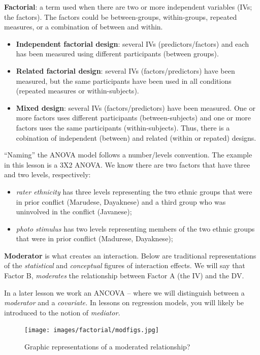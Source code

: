 \documentclass[
  11pt,
]{book}
\providecommand{\tightlist}{%
  \setlength{\itemsep}{0pt}\setlength{\parskip}{0pt}}
\begin{document}
\textbf{Factorial}: a term used when there are two or more independent variables (IVs; the factors). The factors could be between-groups, within-groups, repeated measures, or a combination of between and within.

\begin{itemize}
\tightlist
\item
  \textbf{Independent factorial design}: several IVs (predictors/factors) and each has been measured using different participants (between groups).
\item
  \textbf{Related factorial design}: several IVs (factors/predictors) have been measured, but the same participants have been used in all conditions (repeated measures or within-subjects).
\item
  \textbf{Mixed design}: several IVs (factors/predictors) have been measured. One or more factors uses different participants (between-subjects) and one or more factors uses the same participants (within-subjects). Thus, there is a cobination of independent (between) and related (within or repated) designs.
\end{itemize}

``Naming'' the ANOVA model follows a number/levels convention. The example in this lesson is a 3X2 ANOVA. We know there are two factors that have three and two levels, respectively:

\begin{itemize}
\tightlist
\item
  \emph{rater ethnicity} has three levels representing the two ethnic groups that were in prior conflict (Marudese, Dayaknese) and a third group who was uninvolved in the conflict (Javanese);
\item
  \emph{photo stimulus} has two levels representing members of the two ethnic groups that were in prior conflict (Madurese, Dayaknese);
\end{itemize}

\textbf{Moderator} is what creates an interaction. Below are traditional representations of the \emph{statistical} and \emph{conceptual} figures of interaction effects. We will say that Factor B, \emph{moderates} the relationship between Factor A (the IV) and the DV.

In a later lesson we work an ANCOVA -- where we will distinguish between a \emph{moderator} and a \emph{covariate.} In lessons on regression models, you will likely be introduced to the notion of \emph{mediator.}

\begin{figure}
\centering
\texttt{[image: images/factorial/modfigs.jpg]}
\caption{Graphic representations of a moderated relationship?}
\end{figure}
\end{document}
